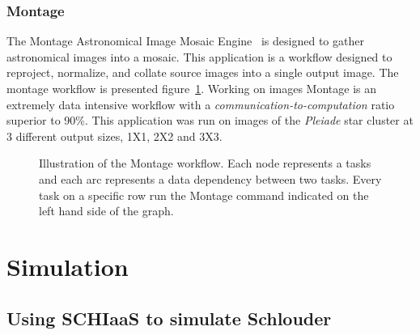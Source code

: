 \subsubsection{Montage}

The Montage  Astronomical Image Mosaic Engine~\cite{montage2009}  is designed to
gather  astronomical images  into  a  mosaic.  This  application  is a  workflow
designed to reproject, normalize, and collate source images into a single output
image. The montage workflow  is presented figure~\ref{fig:montagewf}. Working on
images   Montage   is   an   extremely    data   intensive   workflow   with   a
\emph{communication-to-computation} ratio superior to 90\%. This application was
run on  images of the \emph{Pleiade}  star cluster at 3  different output sizes,
1X1, 2X2 and 3X3.

\begin{figure}[ht]
	
	\caption{Illustration of the Montage workflow. Each node represents a
	tasks and each arc represents a data dependency between two tasks. Every
	task on a specific row run the Montage command indicated on the left
	hand side of the graph.}
	\label{fig:montagewf}
\end{figure}

\section{Simulation}
\label{sc:simulation}

\subsection{Using SCHIaaS to simulate Schlouder}


